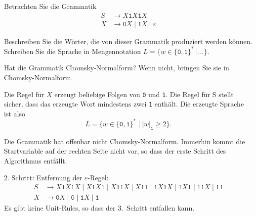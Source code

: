 Betrachten Sie die Grammatik
\begin{align*}
S & \to X \texttt{1} X \texttt{1} X \\
X & \to \texttt{0} X  \;|\; \texttt{1} X \;|\; \varepsilon
\end{align*}
\begin{teilaufgaben}
\item
Beschreiben Sie die Wörter, die von dieser Grammatik produziert werden können.
Schreiben Sie die Sprache in Mengennotation
$L=\{w\in\{\texttt{0},\texttt{1}\}^*\;|\dots\}$.
\item
Hat die Grammatik Chomsky-Normalform?
Wenn nicht, bringen Sie sie in Chomsky-Normalform.
\end{teilaufgaben}

\begin{loesung}
\begin{teilaufgaben}
\item
Die Regel für $X$ erzeugt beliebige Folgen von \texttt{0} und \texttt{1}.
Die Regel für S stellt sicher, dass das erzeugte Wort mindestens zwei
\texttt{1} enthält.
Die erzeugte Sprache ist also
\[
L=\{
w\in\{\texttt{0},\texttt{1}\}^*
\;|\;
|w|_{\texttt{1}} \ge 2\}.
\]
\item
Die Grammatik hat offenbar nicht Chomsky-Normalform.
Immerhin kommt die Startvariable auf der rechten Seite nicht vor,
so dass der erste Schritt des Algorithmus entfällt.

2. Schritt: Entfernung der $\varepsilon$-Regel:
\begin{align*}
S & \to
X \texttt{1} X \texttt{1} X
\;|\;
X \texttt{1} X \texttt{1} 
\;|\;
X \texttt{1}   \texttt{1} X
\;|\;
X \texttt{1}   \texttt{1} 
\;|\;
  \texttt{1} X \texttt{1} X
\;|\;
  \texttt{1} X \texttt{1}  
\;|\;
  \texttt{1}   \texttt{1} X
\;|\;
  \texttt{1}   \texttt{1}  
\\
X & \to
\texttt{0} X
\;|\;
\texttt{0}
\;|\;
\texttt{1} X
\;|\;
\texttt{1}
\end{align*}
Es gibt keine Unit-Rules, so dass der 3.~Schritt entfallen kann.


\end{teilaufgaben}
\end{loesung}
